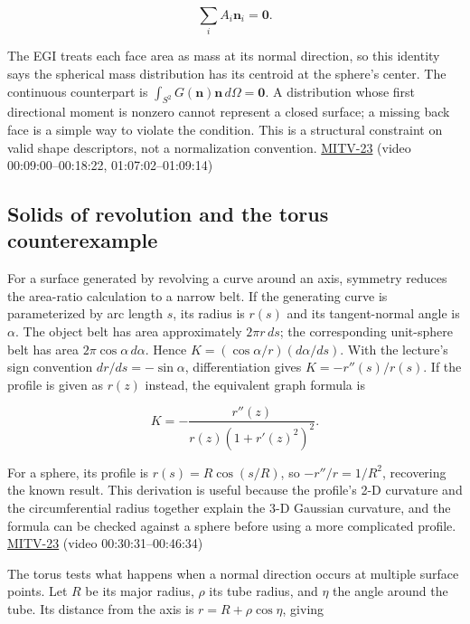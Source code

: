 \[
\sum_i A_i\mathbf n_i=\mathbf 0.
\]

The EGI treats each face area as mass at its normal direction, so this identity says the spherical mass distribution has its centroid at the sphere's center. The continuous counterpart is \(\int_{S^2}G(\mathbf n)\mathbf n\,d\Omega=\mathbf 0\). A distribution whose first directional moment is nonzero cannot represent a closed surface; a missing back face is a simple way to violate the condition. This is a structural constraint on valid shape descriptors, not a normalization convention. \hyperref[04-visual-computing-ii-ch036-mitv-23---gaussian-image-solids-of-revolution-direction-histograms-regular-polyhedra]{MITV-23} (video 00:09:00--00:18:22, 01:07:02--01:09:14)

\subsection{Solids of revolution and the torus counterexample}\label{04-visual-computing-ii-ch032-solids-of-revolution-and-the-torus-counterexample}

For a surface generated by revolving a curve around an axis, symmetry reduces the area-ratio calculation to a narrow belt. If the generating curve is parameterized by arc length \(s\), its radius is \(r(s)\) and its tangent-normal angle is \(\alpha\). The object belt has area approximately \(2\pi r\,ds\); the corresponding unit-sphere belt has area \(2\pi\cos\alpha\,d\alpha\). Hence \(K=(\cos\alpha/r)(d\alpha/ds)\). With the lecture's sign convention \(dr/ds=-\sin\alpha\), differentiation gives \(K=-r''(s)/r(s)\). If the profile is given as \(r(z)\) instead, the equivalent graph formula is

\[
K=-\frac{r''(z)}{r(z)\left(1+r'(z)^2\right)^2}.
\]

For a sphere, its profile is \(r(s)=R\cos(s/R)\), so \(-r''/r=1/R^2\), recovering the known result. This derivation is useful because the profile's 2-D curvature and the circumferential radius together explain the 3-D Gaussian curvature, and the formula can be checked against a sphere before using a more complicated profile. \hyperref[04-visual-computing-ii-ch036-mitv-23---gaussian-image-solids-of-revolution-direction-histograms-regular-polyhedra]{MITV-23} (video 00:30:31--00:46:34)

The torus tests what happens when a normal direction occurs at multiple surface points. Let \(R\) be its major radius, \(\rho\) its tube radius, and \(\eta\) the angle around the tube. Its distance from the axis is \(r=R+\rho\cos\eta\), giving

